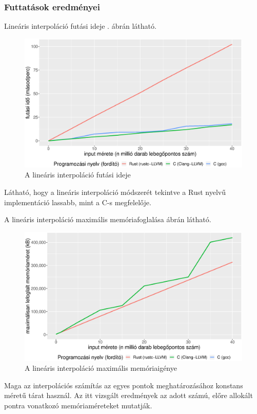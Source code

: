 \subsubsection{Futtatások eredményei}

Lineáris interpoláció futási ideje . ábrán látható.

\begin{figure}[h!]
\centering
\includegraphics[width=15.5cm]{kepek/linear_interpolation_run.eps}
\caption{A lineáris interpoláció futási ideje}
\label{fig:interpolation}
\end{figure}

Látható, hogy a lineáris interpoláció módszerét tekintve a Rust nyelvű implementáció lassabb, mint a C-s megfelelője.

A lineáris interpoláció maximális memóriafoglalása  ábrán látható.

\begin{figure}[h!]
\centering
\includegraphics[width=15.5cm]{kepek/linear_interpolation_memory.eps}
\caption{A lineáris interpoláció maximális memóriaigénye}
\label{fig:interpolation_mem}
\end{figure}

Maga az interpolációs számítás az egyes pontok meghatározásához konstans méretű tárat használ. Az itt vizsgált eredmények az adott számú, előre allokált pontra vonatkozó memóriaméreteket mutatják.
